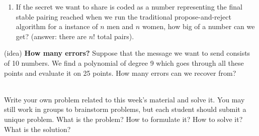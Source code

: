 \documentclass[]{article}
\newif\ifsolutions
\renewcommand{\answer}[1]{{\color{mydarkblue}\textbf{}#1}}
\begin{document}
\begin{qunlist}
\begin{enumerate}
\qpart
\item  If the secret we want to share is coded as a number representing the final stable pairing reached when we run the traditional propose-and-reject algorithm for a instance of $n$ men and $n$ women, how big of a number can we get? (answer: there are $n!$ total pairs).

\end{enumerate}

\qpart
(idea) {\bf How many errors?}
Suppose that the message we want to send consists of 10 numbers. We find a polynomial of degree 9 which goes through all these points and evaluate it on 25 points. How many errors can we recover from?

\ifsolutions{ \answer 
{
For $ k $ erasure errors, we need to send $ k $ additional packets for a total of $ n+k $. Here, $ n=10 $ and $ n+k=25 $, so we can recover from 15 erasure errors.

For $ k $ general errors, we need $ 2k $ additional packets. We have 15 additional packets, so we may recover from $ \lfloor 15/2 \rfloor = 7 $ general errors.
}}\fi


 \\
Write your own problem related to this week's material and solve it. 
You may still work in groups to brainstorm problems, 
but each student should submit a unique problem.  
What is the problem? How to formulate it? 
How to solve it? What is the solution?
  
  
    
\end{qunlist}
\end{document}
